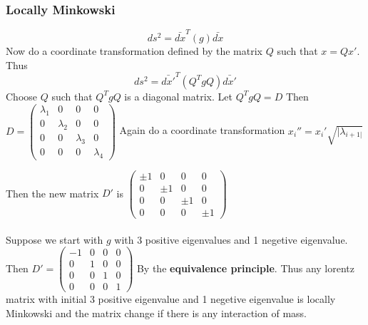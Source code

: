 \documentclass{article}
\begin{document}
\subsubsection{Locally Minkowski }
$$ds^2 = \bar{dx}^T (g)\bar{dx}$$
Now do a coordinate transformation defined by the matrix $Q$ such that $x = Qx'$. Thus$$ds^2 = \bar{dx'}^T (Q^TgQ)\bar{dx'}$$ 
Choose $Q$ such that $Q^TgQ$ is a diagonal matrix. Let $Q^TgQ = D$ Then $D = \begin{pmatrix}
    \lambda_1&0&0&0\\
    0&\lambda_2&0&0\\
    0&0&\lambda_3&0\\
    0&0&0&\lambda_4
\end{pmatrix}$
Again do a coordinate transformation $x_i'' = x_i'\sqrt{|\lambda_{i+1|}}$

Then the new matrix $D'$ is $\begin{pmatrix}
    \pm1&0&0&0\\
    0&\pm1&0&0\\
    0&0&\pm1&0\\
    0&0&0&\pm1
\end{pmatrix}$
\\ \\ 
Suppose we start with $g$ with 3 positive eigenvalues and 1 negetive eigenvalue.
Then $D' = \begin{pmatrix}
    -1&0&0&0\\
    0&1&0&0\\
    0&0&1&0\\
    0&0&0&1
\end{pmatrix}$
By the \textbf{equivalence principle}. Thus any lorentz matrix with initial 3 positive eigenvalue and 1 negetive eigenvalue is locally Minkowski and the matrix change if there is any interaction of mass.
\end{document}
